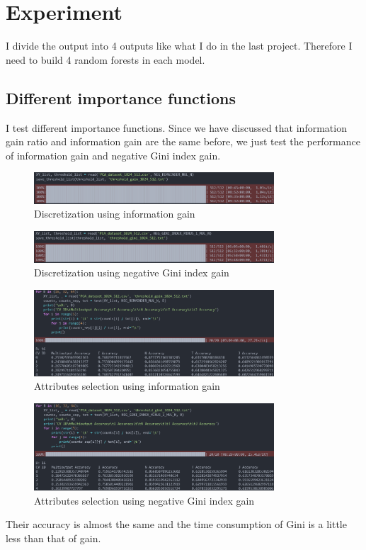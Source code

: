 \documentclass[UTF8, a4paper, 11pt]{article}
\begin{document}
\section{Experiment}
I divide the output into 4 outputs like what I do in the last project.
Therefore I need to build 4 random forests in each model.
\subsection{Different importance functions}
I test different importance functions.
Since we have discussed that information gain ratio and information gain are the same before, we just test the performance of information gain and negative Gini index gain.
\begin{figure}[H]
    \centering
    \includegraphics[width=0.8\textwidth]{1024_512_gain_thre.png}
    \caption{Discretization using information gain}
\end{figure}
\begin{figure}[H]
    \centering
    \includegraphics[width=0.8\textwidth]{1024_512_gini_thre.png}
    \caption{Discretization using negative Gini index gain}
\end{figure}
\begin{figure}[H]
    \centering
    \includegraphics[width=0.8\textwidth]{1024_512_16_gain.png}
    \caption{Attributes selection using information gain}
\end{figure}
\begin{figure}[H]
    \centering
    \includegraphics[width=0.8\textwidth]{1024_512_16_gini.png}
    \caption{Attributes selection using negative Gini index gain}
\end{figure}
Their accuracy is almost the same and the time consumption of Gini is a little less than that of gain.
\end{document}
